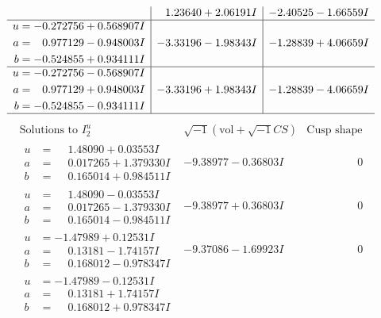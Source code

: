\documentclass[1p]{elsarticle_modified}
\theoremstyle{definition}
\newcommand{\I}{\sqrt{-1}}
\begin{document}
$$\begin{array}{c|c|c}
 & \phantom{-}1.23640 + 2.06191 I & -2.40525 - 1.66559 I \\ \hline\begin{aligned}
u &= -0.272756 + 0.568907 I \\
a &= \phantom{-}0.977129 - 0.948003 I \\
b &= -0.524855 + 0.934111 I\end{aligned}
 & -3.33196 - 1.98343 I & -1.28839 + 4.06659 I \\ \hline\begin{aligned}
u &= -0.272756 - 0.568907 I \\
a &= \phantom{-}0.977129 + 0.948003 I \\
b &= -0.524855 - 0.934111 I\end{aligned}
 & -3.33196 + 1.98343 I & -1.28839 - 4.06659 I\\
 \hline 
 \end{array}$$\newpage$$\begin{array}{c|c|c}  
\text{Solutions to }I^u_{2}& \I (\text{vol} + \sqrt{-1}CS) & \text{Cusp shape}\\
 \hline 
\begin{aligned}
u &= \phantom{-}1.48090 + 0.03553 I \\
a &= \phantom{-}0.017265 + 1.379330 I \\
b &= \phantom{-}0.165014 + 0.984511 I\end{aligned}
 & -9.38977 - 0.36803 I & \phantom{-0.000000 } 0 \\ \hline\begin{aligned}
u &= \phantom{-}1.48090 - 0.03553 I \\
a &= \phantom{-}0.017265 - 1.379330 I \\
b &= \phantom{-}0.165014 - 0.984511 I\end{aligned}
 & -9.38977 + 0.36803 I & \phantom{-0.000000 } 0 \\ \hline\begin{aligned}
u &= -1.47989 + 0.12531 I \\
a &= \phantom{-}0.13181 - 1.74157 I \\
b &= \phantom{-}0.168012 - 0.978347 I\end{aligned}
 & -9.37086 - 1.69923 I & \phantom{-0.000000 } 0 \\ \hline\begin{aligned}
u &= -1.47989 - 0.12531 I \\
a &= \phantom{-}0.13181 + 1.74157 I \\
b &= \phantom{-}0.168012 + 0.978347 I\end{aligned}

\end{array}$$
\end{document}
